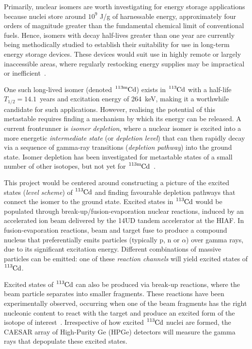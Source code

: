 \documentclass[12pt,a4paper]{article}
\newcommand{\cdm}{\ce{^{113\text{m}}Cd}}
\begin{document}
\medskip
\noindent
Primarily, nuclear isomers are worth investigating for energy storage applications because nuclei store around $10^9$ J/g of harnessable energy, approximately four orders of magnitude greater than the fundamental chemical limit of conventional fuels.
Hence, isomers with decay half-lives greater than one year are currently being methodically studied to establish their suitability for use in long-term energy storage devices.
These devices would suit use in highly remote or largely inaccessible areas, where regularly restocking energy supplies may be impractical or inefficient~\cite{shaffer_innovations_2018}.

\medskip
\noindent
One such long-lived isomer (denoted $\cdm$) exists in $\ce{^{113}Cd}$ with a half-life $T_{1/2} = 14.1$~years and excitation energy of 264~keV, making it a worthwhile candidate for such applications.
However, realising the potential of this metastable requires finding a mechanism by which its energy can be released.
A current frontrunner is \textit{isomer depletion}, where a nuclear isomer is excited into a more energetic \textit{intermediate state} (or \textit{depletion level}) that can then rapidly decay via a sequence of gamma-ray transitions (\textit{depletion pathway}) into the ground state.
Isomer depletion has been investigated for metastable states of a small number of other isotopes, but not yet for $\cdm$~\cite{shaffer_innovations_2018}.

\medskip
\noindent
This project would be centered around constructing a picture of the excited states (\textit{level scheme}) of $\ce{^{113}Cd}$ and finding favourable depletion pathways that connect the isomer to the ground state.
Excited states in $\ce{^{113}Cd}$ would be populated through break-up/fusion-evaporation nuclear reactions, induced by an accelerated ion beam delivered by the 14UD tandem accelerator at the HIAF.
In fusion-evaporation reactions, beam and target fuse to produce a compound nucleus that preferentially emits particles (typically p, n or $\alpha$) over gamma rays, due to its significant excitation energy.
Different combinations of massive particles can be emitted: one of these \textit{reaction channels} will yield excited states of $\ce{^{113}Cd}$.

\medskip
\noindent
Excited states of $\ce{^{113}Cd}$ can also be produced via break-up reactions, where the beam particle separates into smaller fragments.
These reactions have been experimentally observed, occurring when one of the beam fragments has the right nucleonic content to react with the target and produce an excited form of the isotope of interest~\cite{curtis_+li_2005,dasgupta_fusion_1999}. 
Irrespective of how excited $\ce{^{113}Cd}$ nuclei are formed, the CAESAR array of High-Purity Ge (HPGe) detectors will measure the gamma rays that depopulate these excited states.
\end{document}
